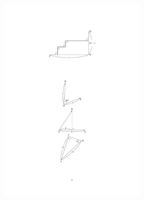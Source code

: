 \documentclass[a4paper,12pt,uplatex]{jsarticle}  %
\begin{document}
\begin{enumerate}
\begin{figure}[ht]
  \centering
  \includegraphics[width=7.0cm]{jizen_1_2_solution.pdf}
\end{figure}

\end{enumerate}

\bigskip

\end{document}
